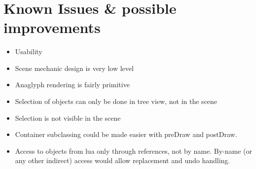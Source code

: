 \section{Known Issues \& possible improvements}
\paragraph{}

\begin{itemize}
\item Usability
\item Scene mechanic design is very low level
\item Anaglyph rendering is fairly primitive
\item Selection of objects can only be done in tree view, not in the scene
\item Selection is not visible in the scene
\item Container subclassing could be made easier with preDraw and postDraw.
\item Access to objects from lua only through references, not by name. By-name (or any other indirect) access would allow replacement and undo handling.
\end{itemize}

